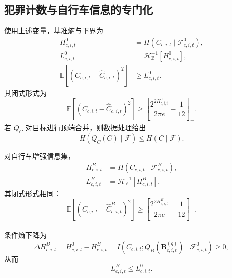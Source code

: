 \subsection{犯罪计数与自行车信息的专门化}
\label{subsec:theory_application_appendix}

使用上述变量，基准熵与下界为
\begin{align}
H^0_{c,i,t}
&=H(C_{c,i,t}\mid\mathcal F^0_{c,i,t}),
\label{eq:crime_baseline_entropy}\\
L^0_{c,i,t}
&=\mathcal H_{\mathbb Z}^{-1}[H^0_{c,i,t}],
\label{eq:local_bound_baseline}\\
\mathbb E[(C_{c,i,t}-\widehat C_{c,i,t})^2]
&\geq L^0_{c,i,t}.
\label{eq:crime_baseline_exact_bound}
\end{align}
其闭式形式为
\begin{equation}
\mathbb E[(C_{c,i,t}-\widehat C_{c,i,t})^2]
\geq
\left[\frac{2^{2H^0_{c,i,t}}}{2\pi e}-\frac1{12}\right]_+ .
\label{eq:crime_baseline_closed_bound}
\end{equation}
若 \(Q_C\) 对目标进行顶端合并，则数据处理给出
\begin{equation}
H(Q_C(C)\mid\mathcal F)\leq H(C\mid\mathcal F).
\label{eq:top_coded_entropy_order}
\end{equation}

对自行车增强信息集，
\begin{align}
H^B_{c,i,t}
&=H(C_{c,i,t}\mid\mathcal F^B_{c,i,t}),
\label{eq:crime_bicycle_entropy}\\
L^B_{c,i,t}
&=\mathcal H_{\mathbb Z}^{-1}[H^B_{c,i,t}],
\label{eq:local_bound_bike}
\end{align}
其闭式形式相同：
\begin{equation}
\mathbb E[(C_{c,i,t}-\widehat C^B_{c,i,t})^2]
\geq
\left[\frac{2^{2H^B_{c,i,t}}}{2\pi e}-\frac1{12}\right]_+ .
\label{eq:crime_bicycle_closed_bound}
\end{equation}

\begin{Proposition}[自行车移动的条件信息价值]
\label{prop:bicycle_information_value}
条件熵下降为
\begin{equation}
\Delta H^B_{c,i,t}
=H^0_{c,i,t}-H^B_{c,i,t}
=I(C_{c,i,t};Q_B(\mathbf B^{(q)}_{c,i,t})
\mid\mathcal F^0_{c,i,t})\geq0,
\label{eq:bicycle_information_gain}
\end{equation}
从而
\begin{equation}
L^B_{c,i,t}\leq L^0_{c,i,t}.
\label{eq:bicycle_exact_bound_order}
\end{equation}
\end{Proposition}

